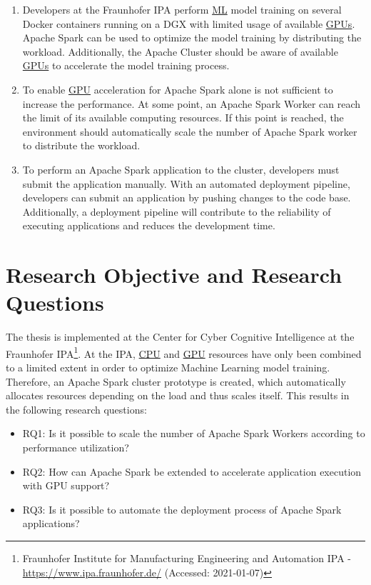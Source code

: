 \begin{enumerate}
\item Developers at the Fraunhofer IPA perform \hyperlink{abbr:ml}{ML} model training on several Docker containers running on a DGX with limited usage of available \hyperlink{abbr:gpu}{GPUs}.
Apache Spark can be used to optimize the model training by distributing the workload.
Additionally, the Apache Cluster should be aware of available \hyperlink{abbr:gpu}{GPUs} to accelerate the model training process.

\item To enable \hyperlink{abbr:gpu}{GPU} acceleration for Apache Spark alone is not sufficient to increase the performance.
At some point, an Apache Spark Worker can reach the limit of its available computing resources.
If this point is reached, the environment should automatically scale the number of Apache Spark worker to distribute the workload.

\item To perform an Apache Spark application to the cluster, developers must submit the application manually.
With an automated deployment pipeline, developers can submit an application by pushing changes to the code base.
Additionally, a deployment pipeline will contribute to the reliability of executing applications and reduces the development time.
\end{enumerate}


\section{Research Objective and Research Questions}
The thesis is implemented at the Center for Cyber Cognitive Intelligence at the Fraunhofer IPA\footnote{Fraunhofer Institute for Manufacturing Engineering and Automation IPA - \url{https://www.ipa.fraunhofer.de/} (Accessed: 2021-01-07)}.
At the IPA, \hyperlink{abbr:cpu}{CPU} and \hyperlink{abbr:gpu}{GPU} resources have only been combined to a limited extent in order to optimize Machine Learning model training.
Therefore, an Apache Spark cluster prototype is created, which automatically allocates resources depending on the load and thus scales itself.
This results in the following research questions:
\begin{itemize}
\item RQ1: Is it possible to scale the number of Apache Spark Workers according to performance utilization?
\item RQ2: How can Apache Spark be extended to accelerate application execution with GPU support?
\item RQ3: Is it possible to automate the deployment process of Apache Spark applications?
\end{itemize}


